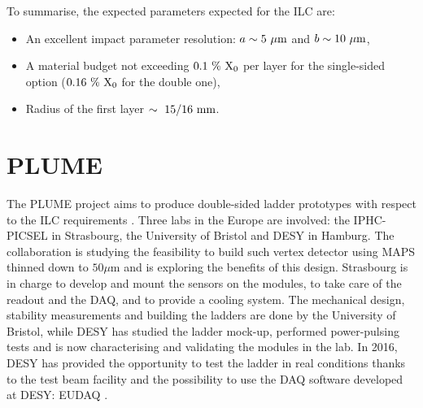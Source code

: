   
   
   


   To summarise, the expected parameters expected for the \gls{ILC} are: 
   \begin{itemize}
     \item An excellent impact parameter resolution: $ a \sim 5~\rm{\mu m}$ and $b \sim 10~\rm{\mu m}$,
     \item A material budget not exceeding $0.1~\%~\rm{X_0}$ per layer for the single-sided option ($0.16~\%~\rm{X_0}$ for the double one),
     \item Radius of the first layer $\sim~15/16~\rm{mm}$.
   \end{itemize}

  \section{PLUME}

  The \acrfull{PLUME} project aims to produce double-sided ladder prototypes with respect to the \gls{ILC} requirements \cite{PLUME}.
  Three labs in the Europe are involved: the IPHC-PICSEL in Strasbourg, the University of Bristol and DESY in Hamburg.
  The collaboration is studying the feasibility to build such vertex detector using \gls{MAPS} thinned down to $50 \mu\text{m}$ and is exploring the benefits of this design.
  Strasbourg is in charge to develop and mount the sensors on the modules, to take care of the readout and the \gls{DAQ}, and to provide a cooling system.
  The mechanical design, stability measurements and building the ladders are done by the University of Bristol, while DESY has studied the ladder mock-up, performed power-pulsing tests and is now characterising and validating the modules in the lab.
  In 2016, DESY has provided the opportunity to test the ladder in real conditions thanks to the test beam facility and the possibility to use the \gls{DAQ} software developed at DESY: EUDAQ \cite{EUDAQ}.

